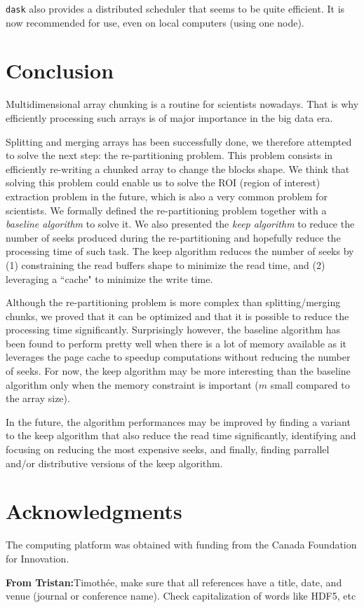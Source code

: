 \documentclass[sigconf, nonacm]{acmart}
\newcommand{\tristan}[1]{\color{orange}\textbf{From Tristan:}#1\color{black}}
\begin{document}
\texttt{dask} also provides a distributed scheduler that seems to be quite
efficient.
It is now recommended for use, even on local computers (using one node).

\section{Conclusion}

Multidimensional array chunking is a routine for scientists nowadays.
That is why efficiently processing such arrays is of major importance in the big data era.

Splitting and merging arrays has been successfully done, we therefore attempted
to solve the next step: the re-partitioning problem.
This problem consists in efficiently re-writing a chunked array to change the blocks shape.
We think that solving this problem could enable us to solve the ROI (region of interest)
extraction problem in the future, which is also a very common problem for scientists.
We formally defined the re-partitioning problem together with a \emph{baseline algorithm} to solve it.
We also presented the \emph{keep algorithm} to reduce the number of seeks produced during
the re-partitioning and hopefully reduce the processing time of such task.
The keep algorithm reduces the number of seeks by
(1) constraining the read buffers shape to minimize the read time, and
(2) leveraging a ``cache" to minimize the write time.

Although the re-partitioning problem is more complex than splitting/merging chunks,
we proved that it can be optimized and that it is possible to reduce the
processing time significantly.
Surprisingly however, the baseline algorithm has been found to perform pretty
well when there is a lot of memory available as it leverages the page cache to
speedup computations without reducing the number of seeks.
For now, the keep algorithm may be more interesting than the baseline algorithm
only when the memory constraint is important ($m$ small compared to the array size).

In the future, the algorithm performances may be improved by finding a variant
to the keep algorithm that also reduce the read time significantly,
identifying and focusing on reducing the most expensive seeks,
and finally, finding parrallel and/or distributive versions of the keep algorithm.

\section{Acknowledgments}

The computing platform was obtained with funding from the Canada Foundation for Innovation.

\tristan{Timothée, make sure that all references have a title, date, and venue (journal or conference name). 
Check capitalization of words like HDF5, etc}



\end{document}
